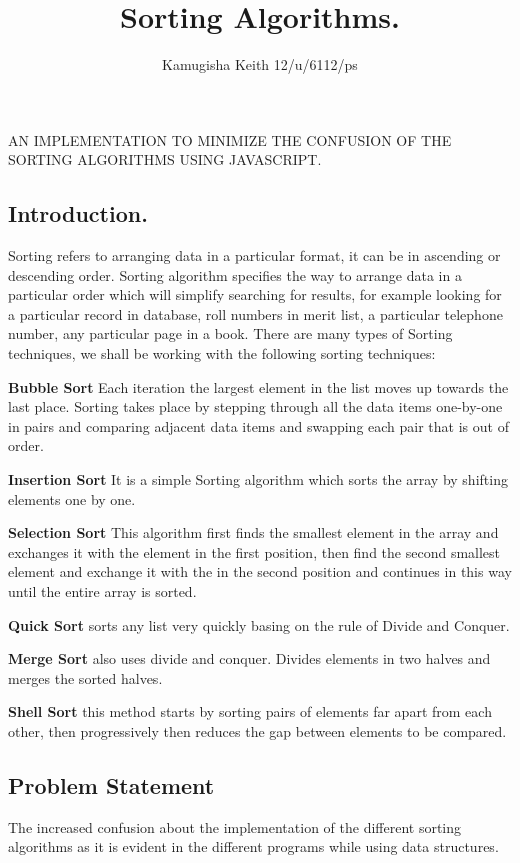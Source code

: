 \documentclass{article}
\title{Sorting Algorithms.}
\author{Kamugisha Keith 12/u/6112/ps}
\begin{document}
AN IMPLEMENTATION TO MINIMIZE THE CONFUSION OF THE SORTING ALGORITHMS USING JAVASCRIPT. 
\subsection{Introduction.}
	Sorting refers to arranging data in a particular format, it can be in ascending or descending order. Sorting algorithm specifies the way to arrange data in a particular order which will simplify searching for results, for example looking for a particular record in database, roll numbers in merit list, a particular telephone number, any particular page in a book.
	There are many types of Sorting techniques, we shall be working with the following sorting techniques:\par
		\textbf{Bubble Sort} Each iteration the largest element in the list moves up towards the last place. Sorting takes place by stepping through all the data items one-by-one in pairs and comparing adjacent data items and swapping each pair that is out of order.\par
		\textbf{Insertion Sort} It is a simple Sorting algorithm which sorts the array by shifting elements one by one.\par
		\textbf{Selection Sort} This algorithm first finds the smallest element in the array and exchanges it with the element in the first position, then find the second smallest element and exchange it with the  in the second position and continues in this way until the entire array is sorted.\par
		\textbf{Quick Sort} sorts any list very quickly basing on the rule of Divide and Conquer.\par
		\textbf{Merge Sort} also uses divide and conquer. Divides elements in two halves and merges the sorted halves.\par
		\textbf{Shell Sort} this method starts by sorting pairs of elements far apart from each other, then progressively then reduces the gap between elements to be compared.

\subsection {Problem Statement}
	The increased confusion about the implementation of the different sorting algorithms as it is evident in the different programs while using data structures.
	
\end{document}
